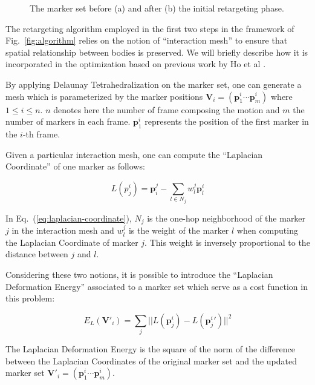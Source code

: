 \documentclass[letterpaper, 10 pt, conference]{ieeeconf}  %
\begin{document}
\begin{figure}[htbp!]
  \vspace*{3cm}
  \caption{The marker set before (a) and after (b) the initial
    retargeting phase.}
  \label{fig:retargeting}
\end{figure}

The retargeting algorithm employed in the first two steps in the
framework of Fig.~\ref{fig:algorithm} relies on 
the notion of ``interaction mesh'' to ensure that   
spatial relationship between bodies is preserved. 
We will briefly describe how it is incorporated in the optimization
based on previous work by Ho et al \cite{Komura10}. 

By applying Delaunay Tetrahedralization \cite{Si2005} on the marker
set, one can generate a mesh which is parameterized by the marker
positions $\mathbf{V}_i = (\mathbf{p}^i_1 \cdots \mathbf{p}^i_m)$
where $1 \leq i \leq n$. $n$ denotes here the number of frame
composing the motion and $m$ the number of markers in each
frame. $\mathbf{p}^i_1$ represents the position of the first marker in
the $i$-th frame.

Given a particular interaction mesh, one can compute the ``Laplacian
Coordinate'' of one marker as follows:

\begin{equation}\label{eq:laplacian-coordinate}
L(p^i_j) = \mathbf{p}_i^j - \sum_{l \in N_j} w^j_l \mathbf{p}^i_l
\end{equation}

In Eq.~(\ref{eq:laplacian-coordinate}), $N_j$ is the one-hop
neighborhood of the marker $j$ in the interaction mesh and $w^j_l$ is the
weight of the marker $l$ when computing the Laplacian Coordinate of
marker $j$. This weight is inversely proportional to the distance
between $j$ and $l$.

Considering these two notions, it is possible to introduce the
``Laplacian Deformation Energy'' associated to a marker set which
serve as a cost function in this problem:

\begin{equation}
E_L(\mathbf{V'}_i) = \sum_j || L(\mathbf{p}^i_j) - L(\mathbf{p}^i_j{}') ||^2
\end{equation}

The Laplacian Deformation Energy is the square of the norm of the
difference between the Laplacian Coordinates of the original marker
set and the updated marker set $\mathbf{V}'_i = (\mathbf{p}^i_1 \cdots
\mathbf{p}^i_m)$.
\end{document}

